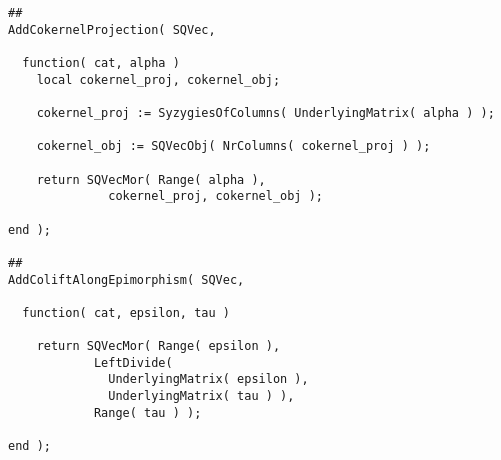 \begin{small}
\begin{Verbatim}[frame=single]
##
AddCokernelProjection( SQVec,

  function( cat, alpha )
    local cokernel_proj, cokernel_obj;

    cokernel_proj := SyzygiesOfColumns( UnderlyingMatrix( alpha ) );

    cokernel_obj := SQVecObj( NrColumns( cokernel_proj ) );

    return SQVecMor( Range( alpha ), 
              cokernel_proj, cokernel_obj );

end );

##
AddColiftAlongEpimorphism( SQVec,
  
  function( cat, epsilon, tau )
    
    return SQVecMor( Range( epsilon ),
            LeftDivide(
              UnderlyingMatrix( epsilon ),
              UnderlyingMatrix( tau ) ),
            Range( tau ) );
    
end );
\end{Verbatim}
\end{small}